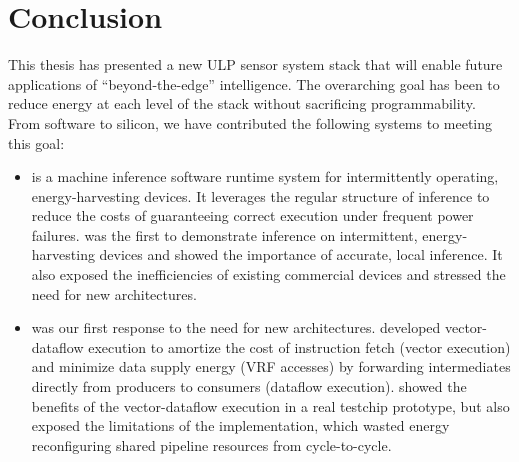 \chapter{Conclusion}
\label{chapter:conclusion}
This thesis has presented a new ULP sensor system stack that will enable future applications of ``beyond-the-edge'' intelligence.
%
The overarching goal has been to reduce energy at each level of the stack without sacrificing programmability.
%
From software to silicon, we have contributed the following systems to meeting this goal:
%

\begin{itemize}

\item \sonic is a machine inference software runtime system for intermittently operating, energy-harvesting devices.
% 
It leverages the regular structure of inference to reduce the costs of guaranteeing correct execution under frequent power failures.
% 
\sonic was the first to demonstrate inference on intermittent, energy-harvesting devices and showed the importance of accurate, local inference.
% 
It also exposed the inefficiencies of existing commercial devices and stressed the need for new architectures.

\item \manic was our first response to the need for new architectures.
% 
\manic developed vector-dataflow execution to amortize the cost of instruction fetch (vector execution) and minimize data supply energy (VRF accesses) by forwarding intermediates directly from producers to consumers (dataflow execution).
% 
\msilicon showed the benefits of the vector-dataflow execution in a real testchip prototype, but also exposed the limitations of the implementation, which wasted energy reconfiguring shared pipeline resources from cycle-to-cycle.


\end{itemize}
